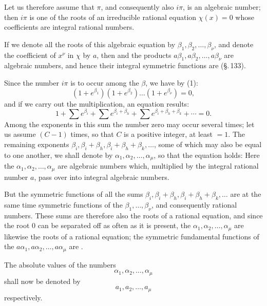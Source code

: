 
Let us therefore assume that $\pi$, and consequently also $i\pi$, is an algebraic number; then $i\pi$ is one of the roots of an irreducible rational equation $\chi(x)=0$ whose coefficients are integral rational numbers.

If we denote all the roots of this algebraic equation by $\beta_1,\beta_2,\ldots,\beta_\nu$, and denote the coefficient of $x^\nu$ in $\chi$ by $a$, then
and the products $a\beta_1,a\beta_2,\ldots,a\beta_\nu$ are  algebraic numbers, and hence their integral symmetric functions are  (\S.\,133).

Since the number $i\pi$ is to occur among the $\beta$, we have by (1):
\[
(1+e^{\beta_1})(1+e^{\beta_2})\ldots(1+e^{\beta_\nu}) = 0,
\]
and if we carry out the multiplication, an equation results:
\[
1 + \sum e^{\beta_i} + \sum e^{\beta_i+\beta_h} + \sum e^{\beta_i+\beta_h+\beta_k} + \cdots = 0.
\]
Among the exponents in this sum the number zero may occur several times; let us assume $(C-1)$ times, so that $C$ is a positive integer, at least $=1$. The remaining exponents $\beta_i,\beta_i+\beta_h,\beta_i+\beta_h+\beta_k,\ldots$, some of which may also be equal to one another, we shall denote by $\alpha_1,\alpha_2,\ldots,\alpha_\mu$, so that the equation holds:
Here the $\alpha_1,\alpha_2,\ldots,\alpha_\mu$ are algebraic numbers which, multiplied by the integral rational number $a$, pass over into integral algebraic numbers.

But the symmetric functions of all the sums $\beta_i,\beta_i+\beta_h,\beta_i+\beta_h+\beta_k,\ldots$ are at the same time symmetric functions of the $\beta_1,\ldots,\beta_\nu$, and consequently rational numbers. These sums are therefore also the roots of a rational equation, and since the root $0$ can be separated off as often as it is present, the $\alpha_1,\alpha_2,\ldots,\alpha_\mu$ are likewise the roots of a rational equation; the symmetric fundamental functions of the $a\alpha_1,a\alpha_2,\ldots,a\alpha_\mu$ are .

The absolute values of the numbers
\[
\alpha_1,\alpha_2,\ldots,\alpha_\mu
\]
shall now be denoted by
\[
a_1,a_2,\ldots,a_\mu
\]
respectively.
